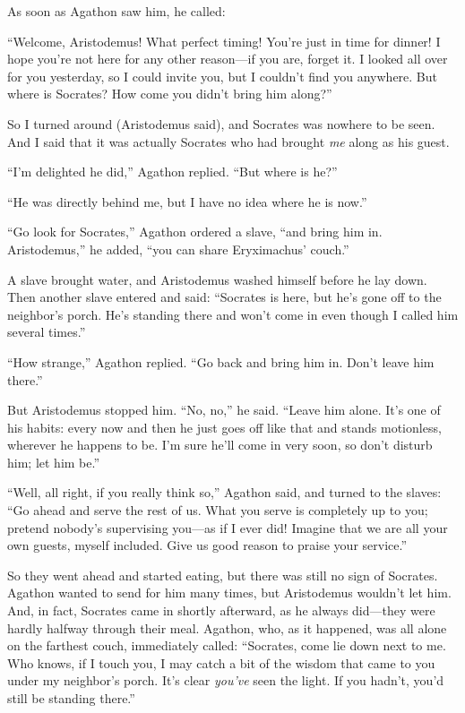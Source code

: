 As soon as Agathon saw him, he called:

“Welcome, Aristodemus! What perfect timing! You're just in time for
dinner! I hope you're not here for any other reason---if you are, forget
it. I looked all over for you yesterday, so I could invite you, but I
couldn't find you anywhere. But where is Socrates? How come you didn't
bring him along?”

So I turned around (Aristodemus said), and Socrates was nowhere to be
seen. And I said that it was actually Socrates who had brought {\em me}
along as his guest.

“I'm delighted he did,” Agathon replied. “But where is
he?”

“He was directly behind me, but I have no idea where he is now.”

“Go look for Socrates,” Agathon ordered a slave, “and bring him in.
Aristodemus,” he added, “you can share Eryximachus' couch.”

A slave brought water, and Aristodemus washed himself before he lay
down. Then another slave entered and said: “Socrates is here, but he's
gone off to the neighbor's porch. He's standing there and won't come in
even though I called him several times.”

“How strange,” Agathon replied. “Go back and bring him in. Don't leave
him there.”

But Aristodemus stopped him. “No, no,” he said. “Leave him alone. It's 
one of his habits: every now and then he just goes off like that
and stands motionless, wherever he happens to be. I'm sure he'll come in
very soon, so don't disturb him; let him be.”

“Well, all right, if you really think so,” Agathon said, and turned to
the slaves: “Go ahead and serve the rest of us. What you serve is
completely up to you; pretend nobody's supervising you---as if I ever
did! Imagine that we are all your own guests, myself included. Give us
good reason to praise your service.”

So they went ahead and started eating, but there was still no sign of
Socrates. Agathon wanted to send for him many times, but Aristodemus
wouldn't let him. And, in fact, Socrates came in shortly afterward, as
he always did---they were hardly halfway through their meal. Agathon,
who, as it happened, was all alone on the farthest couch, immediately
called: “Socrates, come lie down next to me. Who knows, if I touch you,
I may catch a bit of the wisdom that came to you under my
neighbor's porch. It's clear {\em you've} seen the light. If you hadn't,
you'd still be standing there.”

